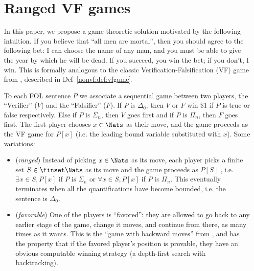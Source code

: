 
\section{Ranged VF games}
\label{nonvf:sec:framework}

In this paper, we propose a game-theoretic solution motivated by the following intuition. If you believe that ``all men are mortal'', then you should agree to the following bet: I can choose the name of any man, and you must be able to give the year by which he will be dead. If you succeed, you win the bet; if you don't, I win. This is formally analogous to the classic Verification-Falsification (VF) game from \citet{hintikkaGameTheoreticSemantics1997}, described in Def~\ref{nonvf:def:vfgame}.

\begin{definition}
  To each FOL sentence $P$ we associate a sequential game between two players, the ``Verifier'' ($V$) and the ``Falsifier'' ($F$). If $P$ is $\Delta_0$, then $V$ or $F$ win \$1 if $P$ is true or false respectively. Else if $P$ is $\Sigma_n$, then $V$ goes first and if $P$ is $\Pi_n$, then $F$ goes first. The first player chooses $x\in\Nats$ as their move, and the game proceeds as the VF game for $P[x]$ (i.e. the leading bound variable substituted with $x$). Some variations:
  \begin{itemize}
  \item (\emph{ranged}) Instead of picking $x\in\Nats$ as its move, each player picks a finite set $S\in\finset\Nats$ as its move and the game proceeds as $P[S]$ , i.e. $\exists x\in S,P[x]$ if $P$ is $\Sigma_n$ or $\forall x\in S,P[x]$ if $P$ is $\Pi_n$. This eventually terminates when all the quantifications have become bounded, i.e. the sentence is $\Delta_0$.
  \item (\emph{favorable}) One of the players is ``favored'': they are allowed to go back to any earlier stage of the game, change it moves, and continue from there, as many times as it wants. This is the ``game with backward moves'' from \citet{bonnayPreuvesJeuxSemantiques2004,boyerProofTruth2012}, and has the property that if the favored player's position is provable, they have an obvious computable winning strategy (a depth-first search with backtracking).
  \end{itemize}
  \label{nonvf:def:vfgame}
\end{definition}

